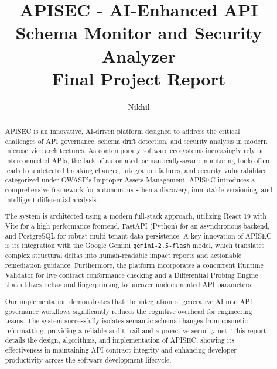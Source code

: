 \documentclass{fisatprojectfinal}
\title{APISEC - AI-Enhanced API Schema Monitor and Security Analyzer \\ \large Final Project Report}
\author{Nikhil}
\begin{document}
\pagestyle{empty}
\maketitle
\makecert
\newpage

\setcounter{page}{1}
\pagestyle{plain}

\renewcommand\abstractname{ABSTRACT}
\begin{abstract}
\vspace{2cm}
\begin{onehalfspace}
APISEC is an innovative, AI-driven platform designed to address the critical challenges of API governance, schema drift detection, and security analysis in modern microservice architectures. As contemporary software ecosystems increasingly rely on interconnected APIs, the lack of automated, semantically-aware monitoring tools often leads to undetected breaking changes, integration failures, and security vulnerabilities categorized under OWASP's Improper Assets Management. APISEC introduces a comprehensive framework for autonomous schema discovery, immutable versioning, and intelligent differential analysis.

The system is architected using a modern full-stack approach, utilizing React 19 with Vite for a high-performance frontend, FastAPI (Python) for an asynchronous backend, and PostgreSQL for robust multi-tenant data persistence. A key innovation of APISEC is its integration with the Google Gemini \texttt{gemini-2.5-flash} model, which translates complex structural deltas into human-readable impact reports and actionable remediation guidance. Furthermore, the platform incorporates a concurrent Runtime Validator for live contract conformance checking and a Differential Probing Engine that utilizes behavioral fingerprinting to uncover undocumented API parameters.

Our implementation demonstrates that the integration of generative AI into API governance workflows significantly reduces the cognitive overhead for engineering teams. The system successfully isolates semantic schema changes from cosmetic reformatting, providing a reliable audit trail and a proactive security net. This report details the design, algorithms, and implementation of APISEC, showing its effectiveness in maintaining API contract integrity and enhancing developer productivity across the software development lifecycle.
\end{onehalfspace}
\end{abstract}
\newpage
\end{document}
